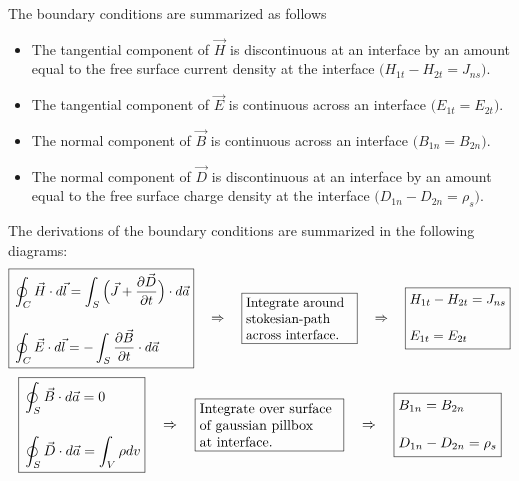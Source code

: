 \documentclass[11pt,a4paper,oneside]{book}
\numberwithin{equation}{section}
\theoremstyle{it}
\theoremstyle{definition}
\begin{document}
The boundary conditions are summarized as follows
\begin{itemize}
	\item The tangential component of $\vec{H}$ is discontinuous at an interface by an amount equal to the free surface current density at the interface $\big(H_{1t}-H_{2t} = J_{ns}\big)$.
	\item The tangential component of $\vec{E}$ is continuous across an interface $\big(E_{1t}=E_{2t}\big)$.
	\item The normal component of $\vec{B}$ is continuous across an interface $\big(B_{1n}=B_{2n}\big)$.
	\item The normal component of $\vec{D}$ is discontinuous at an interface by an amount equal to the free surface charge density at the interface $\big(D_{1n}-D_{2n}=\rho_{s}\big)$.
\end{itemize}  
The derivations of the boundary conditions are summarized in the following diagrams:
\begin{equation*}
\boxed{\begin{aligned}
	&\oint_C\vec{H}\cdot d\vec{l}=\int_S\Big(\vec{J} + \frac{\partial \vec{D}}{\partial t}\Big)\cdot d\vec{a} \\[12pt]
	&\oint_{C}\vec{E}\cdot d\vec{l}=-\int_{S}\frac{\partial \vec{B}}{\partial t}\cdot d\vec{a}
\end{aligned}} \quad\Rightarrow\quad\boxed{\parbox[c]{8em}{Integrate around \\stokesian-path \\across interface.}}\quad\Rightarrow\quad
\boxed{\begin{aligned}
		&H_{1t}-H_{2t} = J_{ns} \\[12pt]
		&E_{1t}=E_{2t}
\end{aligned}}
\end{equation*}
\begin{equation*}
	\boxed{\begin{aligned}
			&\oint_{S}\vec{B}\cdot d\vec{a}=0 \\[12pt]
			&\oint_{S}\vec{D}\cdot d\vec{a}=\int_{V}\rho dv
	\end{aligned}} \quad\Rightarrow\quad\boxed{\parbox[c]{10em}{Integrate over surface \\ of gaussian pillbox \\at interface.}}\quad\Rightarrow\quad
	\boxed{\begin{aligned}
			&B_{1n}=B_{2n} \\[12pt]
			&D_{1n}-D_{2n} = \rho_{s}
	\end{aligned}}
\end{equation*}
\end{document}
